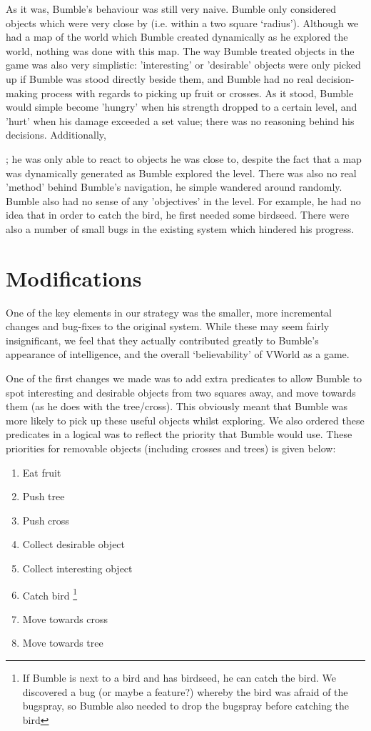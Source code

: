 \documentclass[a4paper,oneside]{report}
\begin{document}
As it was, Bumble's behaviour was still very naive. Bumble only considered objects which were very close by (i.e. within a two square `radius'). Although we had a map of the world which Bumble created dynamically as he explored the world, nothing was done with this map. The way Bumble treated objects in the game was also very simplistic: 'interesting' or 'desirable' objects were only picked up if Bumble was stood directly beside them, and Bumble had no real decision-making process with regards to picking up fruit or crosses. As it stood, Bumble would simple become 'hungry' when his strength dropped to a certain level, and 'hurt' when his damage exceeded a set value; there was no reasoning behind his decisions. Additionally, 

; he was only able to react to objects he was close to, despite the fact that a map was dynamically generated as Bumble explored the level. There was also no real 'method' behind Bumble's navigation, he simple wandered around randomly. Bumble also had no sense of any 'objectives' in the level. For example, he had no idea that in order to catch the bird, he first needed some birdseed. There were also a number of small bugs in the existing system which hindered his progress. 

\section{Modifications}

One of the key elements in our strategy was the smaller, more incremental changes and bug-fixes to the original system. While these may seem fairly insignificant, we feel that they actually contributed greatly to Bumble's appearance of intelligence, and the overall `believability' of VWorld as a game.

One of the first changes we made was to add extra predicates to allow Bumble to spot interesting and desirable objects from two squares away, and move towards them (as he does with the tree/cross). This obviously meant that Bumble was more likely to pick up these useful objects whilst exploring. We also ordered these predicates in a logical was to reflect the priority that Bumble would use. These priorities for removable objects (including crosses and trees) is given below:

\singlespace
\begin{enumerate}
	\item Eat fruit
	\item Push tree
	\item Push cross
	\item Collect desirable object
	\item Collect interesting object
	\item Catch bird \footnote{If Bumble is next to a bird and has birdseed, he can catch the bird. We discovered a bug (or maybe a feature?) whereby the bird was afraid of the bugspray, so Bumble also needed to drop the bugspray before catching the bird}
	\item Move towards cross
	\item Move towards tree
\end{enumerate}
\onehalfspace
\end{document}
